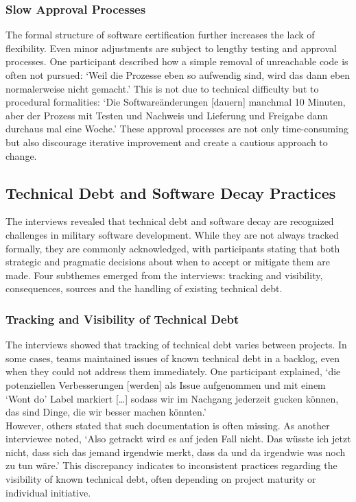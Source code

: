 \subsubsection{Slow Approval Processes}
The formal structure of software certification further increases the lack of flexibility. Even minor adjustments are subject to lengthy testing and approval processes. One participant described how a simple removal of unreachable code is often not pursued:
`Weil die Prozesse eben so aufwendig sind, wird das dann eben normalerweise nicht gemacht.' This is not due to technical difficulty but to procedural formalities: `Die Softwareänderungen [dauern] manchmal 10 Minuten, aber der Prozess mit Testen und Nachweis und Lieferung und Freigabe dann durchaus mal eine Woche.'
These approval processes are not only time-consuming but also discourage iterative improvement and create a cautious approach to change.\\

\subsection{Technical Debt and Software Decay Practices}
The interviews revealed that technical debt and software decay are recognized challenges in military software development. While they are not always tracked formally, they are commonly acknowledged, with participants stating that both strategic and pragmatic decisions about when to accept or mitigate them are made.
Four subthemes emerged from the interviews: tracking and visibility, consequences, sources and the handling of existing technical debt.

\subsubsection{Tracking and Visibility of Technical Debt}
The interviews showed that tracking of technical debt varies between projects. In some cases, teams maintained issues of known technical debt in a backlog, even when they could not address them immediately. One participant explained, `die potenziellen Verbesserungen [werden] als Issue aufgenommen und mit einem `Wont do' Label markiert [\ldots]
sodass wir im Nachgang jederzeit gucken können, das sind Dinge, die wir besser machen könnten.'\\
However, others stated that such documentation is often missing. As another interviewee noted, `Also getrackt wird es auf jeden Fall nicht. Das wüsste ich jetzt nicht, dass sich das jemand irgendwie merkt, dass da und da irgendwie was noch zu tun wäre.'
This discrepancy indicates to inconsistent practices regarding the visibility of known technical debt, often depending on project maturity or individual initiative.\\

